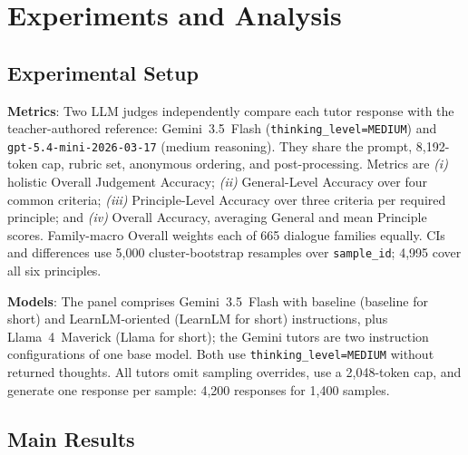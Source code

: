 \documentclass[conference]{IEEEtran}
\begin{document}
\section{Experiments and Analysis}

\subsection{Experimental Setup}

\textbf{Metrics}: Two LLM judges independently compare each tutor response with
the teacher-authored reference: Gemini~3.5~Flash
(\texttt{thinking\_level=MEDIUM}) and
\texttt{gpt-5.4-mini-2026-03-17} (medium reasoning). They share the prompt,
8,192-token cap, rubric set, anonymous ordering, and post-processing. Metrics
are \textit{(i)} holistic Overall Judgement Accuracy; \textit{(ii)}
General-Level Accuracy over four common criteria; \textit{(iii)}
Principle-Level Accuracy over three criteria per required principle; and
\textit{(iv)} Overall Accuracy, averaging General and mean Principle scores.
Family-macro Overall weights each of 665 dialogue families equally. CIs and
differences use 5,000 cluster-bootstrap resamples over \texttt{sample\_id};
4,995 cover all six principles.

\textbf{Models}: The panel comprises Gemini~3.5~Flash with baseline (baseline for short) and
LearnLM-oriented (LearnLM for short) instructions, plus Llama~4~Maverick (Llama for short); the Gemini tutors are two
instruction configurations of one base model. Both use
\texttt{thinking\_level=MEDIUM} without returned thoughts. All tutors omit
sampling overrides, use a 2,048-token cap, and generate one response per sample:
4,200 responses for 1,400 samples.

\subsection{Main Results}
\end{document}
